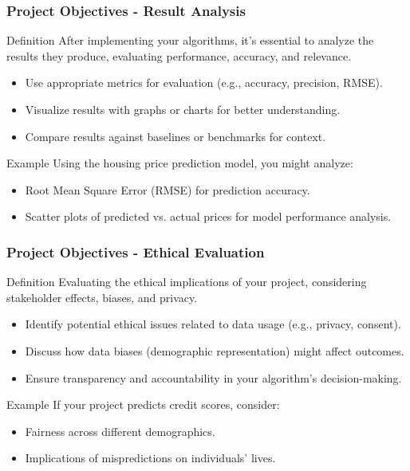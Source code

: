 \documentclass[aspectratio=169]{beamer}
\begin{document}
\begin{frame}[fragile]
    \frametitle{Project Objectives - Result Analysis}
    \begin{block}{Definition}
        After implementing your algorithms, it’s essential to analyze the results they produce, evaluating performance, accuracy, and relevance.
    \end{block}
    
    \begin{itemize}
        \item Use appropriate metrics for evaluation (e.g., accuracy, precision, RMSE).
        \item Visualize results with graphs or charts for better understanding.
        \item Compare results against baselines or benchmarks for context.
    \end{itemize}
    
    \begin{exampleblock}{Example}
        Using the housing price prediction model, you might analyze:
        \begin{itemize}
            \item Root Mean Square Error (RMSE) for prediction accuracy.
            \item Scatter plots of predicted vs. actual prices for model performance analysis.
        \end{itemize}
    \end{exampleblock}
\end{frame}

\begin{frame}[fragile]
    \frametitle{Project Objectives - Ethical Evaluation}
    \begin{block}{Definition}
        Evaluating the ethical implications of your project, considering stakeholder effects, biases, and privacy.
    \end{block}
    
    \begin{itemize}
        \item Identify potential ethical issues related to data usage (e.g., privacy, consent).
        \item Discuss how data biases (demographic representation) might affect outcomes.
        \item Ensure transparency and accountability in your algorithm's decision-making.
    \end{itemize}
    
    \begin{exampleblock}{Example}
        If your project predicts credit scores, consider:
        \begin{itemize}
            \item Fairness across different demographics.
            \item Implications of mispredictions on individuals' lives.
        \end{itemize}
    \end{exampleblock}
\end{frame}
\end{document}
